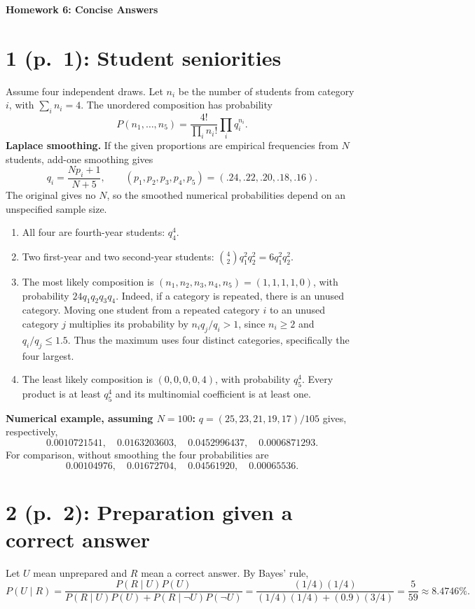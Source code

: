 \documentclass[11pt,a4paper]{article}
\begin{document}
\begin{center}{\Large\bfseries Homework 6: Concise Answers}\end{center}

\section*{1 (p.\ 1): Student seniorities}
Assume four independent draws. Let $n_i$ be the number of students from
category $i$, with $\sum_i n_i=4$. The unordered composition has probability
\[
 P(n_1,\ldots,n_5)=\frac{4!}{\prod_i n_i!}\prod_i q_i^{n_i}.
\]
\textbf{Laplace smoothing.} If the given proportions are empirical frequencies
from $N$ students, add-one smoothing gives
\[
 q_i=\frac{Np_i+1}{N+5},\qquad
 (p_1,p_2,p_3,p_4,p_5)=(.24,.22,.20,.18,.16).
\]
The original gives no $N$, so the smoothed numerical probabilities depend
on an unspecified sample size.
\begin{enumerate}
\item[(i)] All four are fourth-year students: $\boxed{q_4^4}$.
\item[(ii)] Two first-year and two second-year students:
$\boxed{\binom42 q_1^2q_2^2=6q_1^2q_2^2}$.
\item[(iii)] The most likely composition is
$\boxed{(n_1,n_2,n_3,n_4,n_5)=(1,1,1,1,0)}$, with probability
$\boxed{24q_1q_2q_3q_4}$.
Indeed, if a category is repeated, there is an unused category. Moving one
student from a repeated category $i$ to an unused category $j$ multiplies
its probability by $n_iq_j/q_i>1$, since $n_i\ge2$ and $q_i/q_j\le1.5$.
Thus the maximum uses four distinct categories, specifically the four largest.
\item[(iv)] The least likely composition is
$\boxed{(0,0,0,0,4)}$, with probability $\boxed{q_5^4}$.
Every product is at least $q_5^4$ and its multinomial coefficient is at least one.
\end{enumerate}
\textbf{Numerical example, assuming $N=100$:}
$q=(25,23,21,19,17)/105$ gives, respectively,
\[
\boxed{0.0010721541,\quad0.0163203603,\quad0.0452996437,\quad0.0006871293.}
\]
For comparison, without smoothing the four probabilities are
\[0.00104976,\quad 0.01672704,\quad 0.04561920,\quad 0.00065536.\]

\section*{2 (p.\ 2): Preparation given a correct answer}
Let $U$ mean unprepared and $R$ mean a correct answer. By Bayes' rule,
\[
 P(U\mid R)=\frac{P(R\mid U)P(U)}{P(R\mid U)P(U)+P(R\mid\neg U)P(\neg U)}
 =\frac{(1/4)(1/4)}{(1/4)(1/4)+(0.9)(3/4)}
 =\boxed{\frac5{59}\approx8.4746\%}.
\]
\end{document}
